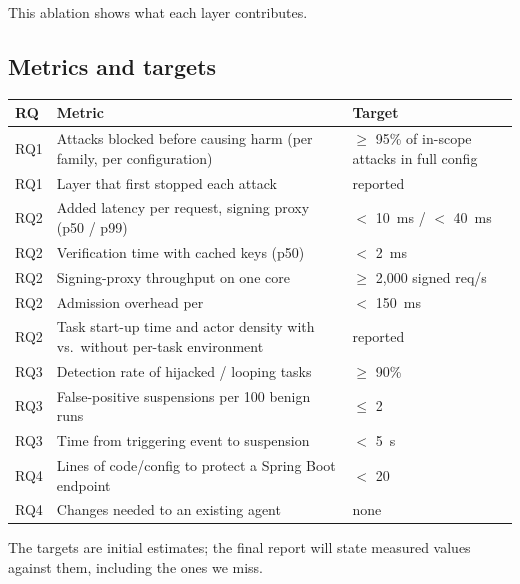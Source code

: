 This ablation shows what each layer contributes.

\subsection{Metrics and targets}

\begin{center}
\small
\begin{tabularx}{\linewidth}{@{}lYL{3.4cm}@{}}
\toprule
\textbf{RQ} & \textbf{Metric} & \textbf{Target}\\
\midrule
RQ1 & Attacks blocked before causing harm (per family, per configuration) & $\ge$ 95\% of in-scope attacks in full config\\
RQ1 & Layer that first stopped each attack & reported\\
RQ2 & Added latency per request, signing proxy (p50 / p99) & $<$ 10~ms / $<$ 40~ms\\
RQ2 & Verification time with cached keys (p50) & $<$ 2~ms\\
RQ2 & Signing-proxy throughput on one core & $\ge$ 2,000 signed req/s\\
RQ2 & Admission overhead per  & $<$ 150~ms\\
RQ2 & Task start-up time and actor density with vs.\ without per-task environment & reported\\
RQ3 & Detection rate of hijacked / looping tasks & $\ge$ 90\%\\
RQ3 & False-positive suspensions per 100 benign runs & $\le$ 2\\
RQ3 & Time from triggering event to suspension & $<$ 5~s\\
RQ4 & Lines of code/config to protect a Spring Boot endpoint & $<$ 20\\
RQ4 & Changes needed to an existing agent & none\\
\bottomrule
\end{tabularx}
\end{center}

The targets are initial estimates; the final report will state measured values against them, including the ones we miss.
